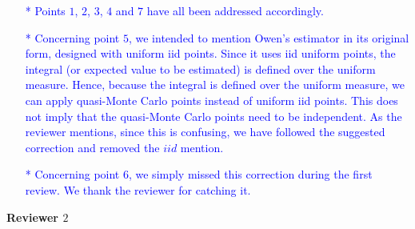 \documentclass[10pt,a4paper]{article}
\begin{document}
\textcolor{blue}{
\begin{itemize}
\item[*]Points $1$, $2$, $3$, $4$ and $7$ have all been addressed accordingly.
\item[*]Concerning point $5$, we intended to mention Owen's estimator in its original form, designed with uniform iid points. Since it uses iid uniform points, the integral (or expected value to be estimated) is defined over the uniform measure. Hence, because the integral is defined over the uniform measure, we can apply quasi-Monte Carlo points instead of uniform iid points. This does not imply that the quasi-Monte Carlo points need to be independent. As the reviewer mentions, since this is confusing, we have followed the suggested correction and removed the $iid$ mention.
\item[*]Concerning point $6$, we simply missed this correction during the first review. We thank the reviewer for catching it.
\end{itemize}}

\newpage
\textbf{\large{Reviewer $2$}}
\vspace*{0.5cm}
\end{document}
